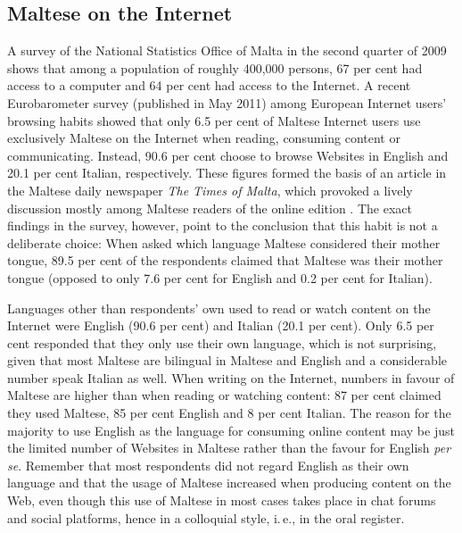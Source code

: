 \begin{multicols}{2}
\subsection{Maltese on the Internet}

A survey of the National Statistics Office of Malta in the second quarter of 2009 \cite{NSO2} shows that among a population of roughly 400,000 persons, 67 per cent had access to a computer and 64 per cent had access to the Internet. A recent Eurobarometer survey (published in May 2011) \cite{Eurobarometer1} among European Internet users' browsing habits showed that only 6.5 per cent of Maltese Internet users use exclusively Maltese on the Internet when reading, consuming content or communicating. Instead, 90.6 per cent choose to browse Websites in English and 20.1 per cent Italian, respectively. These figures formed the basis of an article in the Maltese daily newspaper \emph{The Times of Malta}, which provoked a lively discussion mostly among Maltese readers of the online edition \cite{TimesOfMalta1}. 
The exact findings in the survey, however, point to the conclusion that this habit is not a deliberate choice: When asked which language Maltese considered their mother tongue, 89.5 per cent of the respondents claimed that Maltese was their mother tongue (opposed to only 7.6 per cent for English and 0.2 per cent for Italian). 

Languages other than respondents' own used to read or watch content on the Internet were English (90.6 per cent) and Italian (20.1 per cent). Only 6.5 per cent responded that they only use their own language, which is not surprising, given that most Maltese are bilingual in Maltese and English and a considerable number speak Italian as well.
When writing on the Internet, numbers in favour of Maltese are higher than when reading or watching content: 87 per cent claimed they used Maltese, 85 per cent English and 8 per cent Italian. 
The reason for the majority to use English as the language for consuming online content may be just the limited number of Websites in Maltese rather than the favour for English \emph{per se}. Remember that most respondents did not regard English as their own language and that the usage of Maltese increased when producing content on the Web, even though this use of Maltese in most cases takes place in chat forums and social platforms, hence in a colloquial style, i.\,e., in the oral register. 


\end{multicols}
